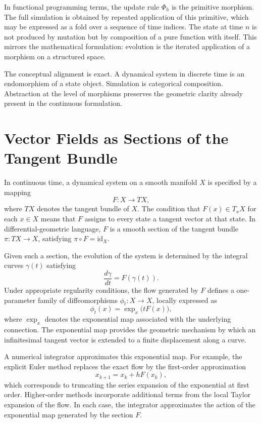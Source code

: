 \documentclass[12pt]{book}
\begin{document}
In functional programming terms, the update rule $\Phi_h$ is the primitive
morphism. The full simulation is obtained by repeated application of this
primitive, which may be expressed as a fold over a sequence of time indices.
The state at time $n$ is not produced by mutation but by composition of a
pure function with itself. This mirrors the mathematical formulation:
evolution is the iterated application of a morphism on a structured space.

The conceptual alignment is exact. A dynamical system in discrete time is an
endomorphism of a state object. Simulation is categorical composition.
Abstraction at the level of morphisms preserves the geometric clarity already
present in the continuous formulation.

\section{Vector Fields as Sections of the Tangent Bundle}

In continuous time, a dynamical system on a smooth manifold $X$ is specified by a mapping
\[
F : X \to TX,
\]
where $TX$ denotes the tangent bundle of $X$. The condition that $F(x) \in T_xX$ for each $x \in X$ means that $F$ assigns to every state a tangent vector at that state. In differential-geometric language, $F$ is a smooth section of the tangent bundle $\pi : TX \to X$, satisfying $\pi \circ F = \mathrm{id}_X$.

Given such a section, the evolution of the system is determined by the integral curves $\gamma(t)$ satisfying
\[
\frac{d\gamma}{dt} = F(\gamma(t)).
\]
Under appropriate regularity conditions, the flow generated by $F$ defines a one-parameter family of diffeomorphisms $\phi_t : X \to X$, locally expressed as
\[
\phi_t(x) = \exp_x\!\big(t F(x)\big),
\]
where $\exp_x$ denotes the exponential map associated with the underlying connection. The exponential map provides the geometric mechanism by which an infinitesimal tangent vector is extended to a finite displacement along a curve.

A numerical integrator approximates this exponential map. For example, the explicit Euler method replaces the exact flow by the first-order approximation
\[
x_{k+1} = x_k + h F(x_k),
\]
which corresponds to truncating the series expansion of the exponential at first order. Higher-order methods incorporate additional terms from the local Taylor expansion of the flow. In each case, the integrator approximates the action of the exponential map generated by the section $F$.
\end{document}
